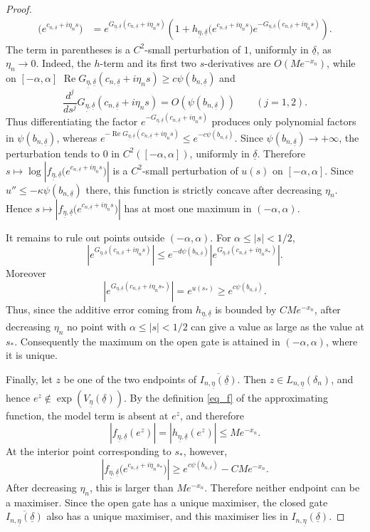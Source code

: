 \documentclass[a4paper, 11pt, reqno]{amsart}
\numberwithin{equation}{section}
\theoremstyle{plain}
\theoremstyle{remark}
\newcommand{\uldelta}{\underline{\delta}}
\newcommand{\uleta}{\underline{\eta}}
\newcommand{\Rea}{\operatorname{Re }}
\begin{document}
\begin{proof}
\[\begin{aligned}
		\bigl(e^{c_{n,\uldelta}+i\eta_ns}\bigr)
		&=
		e^{G_{\uleta,\uldelta}(c_{n,\uldelta}+i\eta_ns)}
		\left(
		1+
		h_{\uleta,\uldelta}
		\bigl(e^{c_{n,\uldelta}+i\eta_ns}\bigr)
		e^{-G_{\uleta,\uldelta}(c_{n,\uldelta}+i\eta_ns)}
		\right).
	\end{aligned}
	\]
	The term in parentheses is a \(C^2\)-small perturbation of \(1\), uniformly
	in \(\uldelta\), as \(\eta_n\to0\). Indeed, the \(h\)-term and its first two
	\(s\)-derivatives are \(O(Me^{-x_n})\), while on \([-\alpha,\alpha]\)
	$
	\Rea G_{\uleta,\uldelta}(c_{n,\uldelta}+i\eta_ns)
	\ge
	c\psi(b_{n,\uldelta})
	$
	and
	\[
	\frac{d^j}{ds^j}
	G_{\uleta,\uldelta}(c_{n,\uldelta}+i\eta_ns)
	=
	O(\psi(b_{n,\uldelta}))
	\qquad (j=1,2).
	\]
	Thus differentiating the factor
	\(e^{-G_{\uleta,\uldelta}(c_{n,\uldelta}+i\eta_ns)}\) produces only polynomial
	factors in \(\psi(b_{n,\uldelta})\), whereas
	$
	e^{-\Rea G_{\uleta,\uldelta}(c_{n,\uldelta}+i\eta_ns)}
	\le
	e^{-c\psi(b_{n,\uldelta})}.
	$
	Since \(\psi(b_{n,\uldelta})\to+\infty\), the perturbation tends to \(0\) in
	\(C^2([-\alpha,\alpha])\), uniformly in \(\uldelta\). Therefore
	$
	s\mapsto
	\log\left|
	f_{\uleta,\uldelta}
	\bigl(e^{c_{n,\uldelta}+i\eta_ns}\bigr)
	\right|
	$
	is a \(C^2\)-small perturbation of \(u(s)\) on \([-\alpha,\alpha]\). Since
	\(u''\le-\kappa\psi(b_{n,\uldelta})\) there, this function is strictly
	concave after decreasing \(\eta_n\). Hence
	$
	s\mapsto
	\left|
	f_{\uleta,\uldelta}
	\bigl(e^{c_{n,\uldelta}+i\eta_ns}\bigr)
	\right|
	$
	has at most one maximum in \((-\alpha,\alpha)\).
	
	It remains to rule out points outside \((-\alpha,\alpha)\). For
	\(\alpha\le |s|<1/2\),
	\[
	\left|
	e^{G_{\uleta,\uldelta}(c_{n,\uldelta}+i\eta_ns)}
	\right|
	\le
	e^{-d\psi(b_{n,\uldelta})}
	\left|
	e^{G_{\uleta,\uldelta}(c_{n,\uldelta}+i\eta_ns_*)}
	\right|.
	\]
	Moreover
	\[
	\left|
	e^{G_{\uleta,\uldelta}(c_{n,\uldelta}+i\eta_ns_*)}
	\right|
	=
	e^{u(s_*)}
	\ge
	e^{c\psi(b_{n,\uldelta})}.
	\]
	Thus, since the additive error coming from \(h_{\uleta,\uldelta}\) is bounded
	by \(CMe^{-x_n}\), after decreasing \(\eta_n\) no point with
	\(\alpha\le |s|<1/2\) can give a value as large as the value at \(s_*\).
	Consequently the maximum on the open gate is attained in
	\((-\alpha,\alpha)\), where it is unique.
	
	Finally, let \(z\) be one of the two endpoints of
	\(\overline{I_{n,\uleta}(\uldelta)}\). Then
	\(z\in L_{n,\uleta}(\delta_n)\), and hence
	\(e^z\notin\exp(V_{\uleta}(\uldelta))\). By the definition
	\eqref{eq_f} of the approximating function, the model term is absent at
	\(e^z\), and therefore
	\[
	|f_{\uleta,\uldelta}(e^z)|
	=
	|h_{\uleta,\uldelta}(e^z)|
	\le
	Me^{-x_n}.
	\]
	At the interior point corresponding to \(s_*\), however,
	\[
	\left|
	f_{\uleta,\uldelta}
	\bigl(e^{c_{n,\uldelta}+i\eta_ns_*}\bigr)
	\right|
	\ge
	e^{c\psi(b_{n,\uldelta})}
	-
	CMe^{-x_n}.
	\]
	After decreasing \(\eta_n\), this is larger than \(Me^{-x_n}\). Therefore
	neither endpoint can be a maximiser. Since the open gate has a unique
	maximiser, the closed gate
	\(\overline{I_{n,\uleta}(\uldelta)}\) also has a unique maximiser, and this
	maximiser lies in \(I_{n,\uleta}(\uldelta)\).
	

\end{proof}
\end{document}
